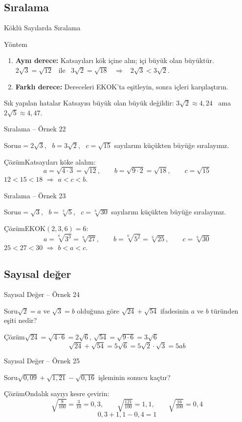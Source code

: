 \documentclass[aspectratio=169,11pt,handout]{beamer}
\newcommand{\soru}[3]{%
\begin{frame}{#1}
  \begin{block}{Soru}\large #2\end{block}
  \pause
  \begin{exampleblock}{Çözüm}\large #3\end{exampleblock}
\end{frame}}
\begin{document}
\subsection{Sıralama}
\begin{frame}{Köklü Sayılarda Sıralama}
\begin{block}{Yöntem}
\begin{enumerate}
\item \textbf{Aynı derece:} Katsayıları kök içine alın; içi büyük olan büyüktür.\\
\(2\sqrt3=\sqrt{12}\) \ ile \ \(3\sqrt2=\sqrt{18}\) \ \(\Rightarrow\) \ \(2\sqrt3<3\sqrt2\).
\item \textbf{Farklı derece:} Dereceleri EKOK'ta eşitleyin, sonra içleri karşılaştırın.
\end{enumerate}
\end{block}
\begin{alertblock}{Sık yapılan hatalar}
Katsayısı büyük olan büyük değildir: \(3\sqrt2\approx 4{,}24\) \ ama \ \(2\sqrt5\approx 4{,}47\).
\end{alertblock}
\end{frame}

\soru{Sıralama -- Örnek 22}
{\(a=2\sqrt3\), \ \(b=3\sqrt2\), \ \(c=\sqrt{15}\) sayılarını küçükten büyüğe sıralayınız.}
{Katsayıları köke alalım:
\[a=\sqrt{4\cdot 3}=\sqrt{12},\qquad b=\sqrt{9\cdot 2}=\sqrt{18},\qquad c=\sqrt{15}\]
\(12<15<18\) \(\Rightarrow\) \(a<c<b\).}

\soru{Sıralama -- Örnek 23}
{\(a=\sqrt3\), \ \(b=\sqrt[3]{5}\), \ \(c=\sqrt[6]{30}\) sayılarını küçükten büyüğe sıralayınız.}
{EKOK\((2,3,6)=6\):
\[a=\sqrt[6]{3^3}=\sqrt[6]{27},\qquad b=\sqrt[6]{5^2}=\sqrt[6]{25},\qquad c=\sqrt[6]{30}\]
\(25<27<30\) \(\Rightarrow\) \(b<a<c\).}

\subsection{Sayısal değer}
\soru{Sayısal Değer -- Örnek 24}
{\(\sqrt2=a\) ve \(\sqrt3=b\) olduğuna göre \(\sqrt{24}+\sqrt{54}\) ifadesinin \(a\) ve \(b\) türünden eşiti nedir?}
{\(\sqrt{24}=\sqrt{4\cdot 6}=2\sqrt6\), \quad \(\sqrt{54}=\sqrt{9\cdot 6}=3\sqrt6\)
\[\sqrt{24}+\sqrt{54}=5\sqrt6=5\sqrt2\cdot\sqrt3=5ab\]}

\soru{Sayısal Değer -- Örnek 25}
{\(\sqrt{0{,}09}+\sqrt{1{,}21}-\sqrt{0{,}16}\) işleminin sonucu kaçtır?}
{Ondalık sayıyı kesre çevirin:
\[\sqrt{\tfrac{9}{100}}=\tfrac{3}{10}=0{,}3,\qquad \sqrt{\tfrac{121}{100}}=1{,}1,\qquad \sqrt{\tfrac{16}{100}}=0{,}4\]
\[0{,}3+1{,}1-0{,}4=1\]}
\end{document}
